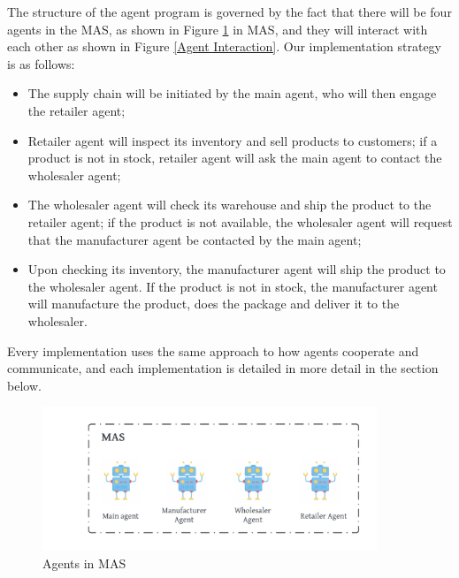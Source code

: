 The structure of the agent program is governed by the fact that there will be four agents in the MAS, as shown in Figure \ref{Agents in MAS} in MAS, and they will interact with each other as shown in Figure \ref{Agent Interaction}. Our implementation strategy is as follows:

 \vspace{.5cm}
 
\begin{itemize}
    \item The supply chain will be initiated by the main agent, who will then engage the retailer agent;
    
    \vspace{.5cm}
    
    \item Retailer agent will inspect its inventory and sell products to customers; if a product is not in stock, retailer agent will ask the main agent to contact the wholesaler agent;
    
    \vspace{.5cm}
    
    \item The wholesaler agent will check its warehouse and ship the product to the retailer agent; if the product is not available, the wholesaler agent will request that the manufacturer agent be contacted by the main agent;
    
    \vspace{.5cm}
    
    \item Upon checking its inventory, the manufacturer agent will ship the product to the wholesaler agent. If the product is not in stock, the manufacturer agent will manufacture the product, does the package and deliver it to the wholesaler.
    
    \vspace{.5cm}
    
\end{itemize}

Every implementation uses the same approach to how agents cooperate and communicate, and each implementation is detailed in more detail in the section below.

\begin{figure}[h]
\centering
  \includegraphics[width=10cm]{includes/figures/MAS.png} 
  \caption{Agents in \ac{MAS}}
  \label{Agents in MAS}
\end{figure}

